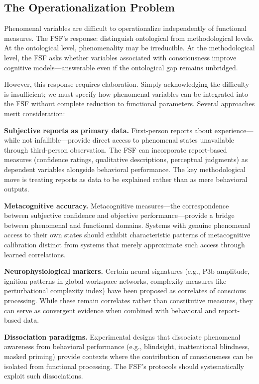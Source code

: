 \documentclass[12pt,a4paper]{article}
\begin{document}
\subsection{The Operationalization Problem}

Phenomenal variables are difficult to operationalize independently of functional measures. The FSF's response: distinguish ontological from methodological levels. At the ontological level, phenomenality may be irreducible. At the methodological level, the FSF asks whether variables associated with consciousness improve cognitive models---answerable even if the ontological gap remains unbridged.

However, this response requires elaboration. Simply acknowledging the difficulty is insufficient; we must specify how phenomenal variables can be integrated into the FSF without complete reduction to functional parameters. Several approaches merit consideration:

\textbf{Subjective reports as primary data.} First-person reports about experience---while not infallible---provide direct access to phenomenal states unavailable through third-person observation. The FSF can incorporate report-based measures (confidence ratings, qualitative descriptions, perceptual judgments) as dependent variables alongside behavioral performance. The key methodological move is treating reports as data to be explained rather than as mere behavioral outputs.

\textbf{Metacognitive accuracy.} Metacognitive measures---the correspondence between subjective confidence and objective performance---provide a bridge between phenomenal and functional domains. Systems with genuine phenomenal access to their own states should exhibit characteristic patterns of metacognitive calibration distinct from systems that merely approximate such access through learned correlations.

\textbf{Neurophysiological markers.} Certain neural signatures (e.g., P3b amplitude, ignition patterns in global workspace networks, complexity measures like perturbational complexity index) have been proposed as correlates of conscious processing. While these remain correlates rather than constitutive measures, they can serve as convergent evidence when combined with behavioral and report-based data.

\textbf{Dissociation paradigms.} Experimental designs that dissociate phenomenal awareness from behavioral performance (e.g., blindsight, inattentional blindness, masked priming) provide contexts where the contribution of consciousness can be isolated from functional processing. The FSF's protocols should systematically exploit such dissociations.
\end{document}
